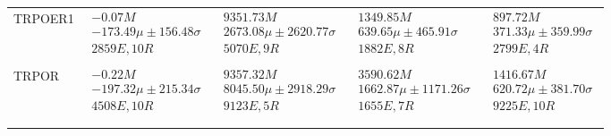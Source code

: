 \begin{tabular}{|l|p{3.2cm}|p{3.2cm}|p{3.2cm}|p{3.2cm}|}
TRPOER1 & $\begin{array}{c} -0.07M \\ -173.49\mu \pm 156.48\sigma \\ 2859E, 10R \end{array}$ & $\begin{array}{c} 9351.73M \\ 2673.08\mu \pm 2620.77\sigma \\ 5070E, 9R \end{array}$ & $\begin{array}{c} 1349.85M \\ 639.65\mu \pm 465.91\sigma \\ 1882E, 8R \end{array}$ & $\begin{array}{c} 897.72M \\ 371.33\mu \pm 359.99\sigma \\ 2799E, 4R \end{array}$ \\ \\ \hline
TRPOR & $\begin{array}{c} -0.22M \\ -197.32\mu \pm 215.34\sigma \\ 4508E, 10R \end{array}$ & $\begin{array}{c} 9357.32M \\ 8045.50\mu \pm 2918.29\sigma \\ 9123E, 5R \end{array}$ & $\begin{array}{c} 3590.62M \\ 1662.87\mu \pm 1171.26\sigma \\ 1655E, 7R \end{array}$ & $\begin{array}{c} 1416.67M \\ 620.72\mu \pm 381.70\sigma \\ 9225E, 10R \end{array}$ \\ \\ \hline
\bottomrule \\ \hline
\end{tabular}
